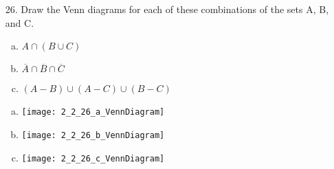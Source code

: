 \begin{itemize}
   \item[26.] Draw the Venn diagrams for each of these combinations of the sets A, B, and C.
         \begin{enumerate}[a.]
            \item $A \cap (B \cup C)$
            \item $\overline{A} \cap \overline{B} \cap \overline{C}$
            \item $(A - B) \cup (A - C) \cup (B - C)$
         \end{enumerate}
         \begin{enumerate}[a.]
            \item \vspace{3mm} \texttt{[image: 2\_2\_26\_a\_VennDiagram]}
            \item \vspace{3mm} \texttt{[image: 2\_2\_26\_b\_VennDiagram]}
            \item \vspace{3mm} \texttt{[image: 2\_2\_26\_c\_VennDiagram]}
         \end{enumerate}
\end{itemize}

